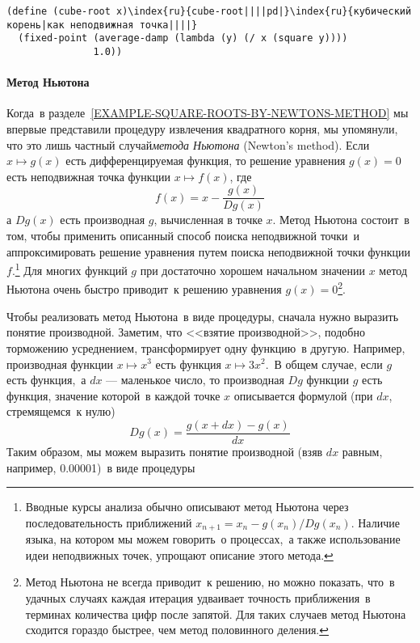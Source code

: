 \begin{Verbatim}[fontsize=\small]
(define (cube-root x)\index{ru}{cube-root||||pd|}\index{ru}{кубический корень|как неподвижная точка||||}
  (fixed-point (average-damp (lambda (y) (/ x (square y))))
               1.0))
\end{Verbatim}

\paragraph{Метод Ньютона}


 Когда~в разделе~\ref{EXAMPLE-SQUARE-ROOTS-BY-NEWTONS-METHOD} мы впервые
представили процедуру извлечения квадратного корня, мы упомянули, что
это лишь частный случай{\em метода
Ньютона} (Newton's method). Если $x \mapsto g(x)$ есть дифференцируемая 
функция, то решение уравнения $g(x) = 0$ есть неподвижная 
точка функции $x \mapsto f(x)$, где
$$
f(x) = x - \dfrac{g(x)}{Dg(x)}
$$
а $Dg(x)$ есть
производная $g$, вычисленная в
точке $x$. Метод Ньютона состоит~в том, чтобы применить
описанный способ поиска неподвижной точки~и аппроксимировать
решение уравнения путем поиска неподвижной точки функции
$f$.\footnote{Вводные курсы анализа обычно описывают метод Ньютона
через последовательность приближений $x_{n+1} = x_n - g(x_n)
/ Dg(x_n)$.  Наличие языка, на котором мы можем
говорить~о процессах,~а также использование идеи неподвижных точек,
упрощают описание этого метода.
}
Для многих функций $g$ при достаточно хорошем начальном
значении $x$ метод Ньютона очень быстро приводит~к решению
уравнения $g(x) = 0$\footnote{Метод Ньютона не всегда приводит~к решению, но можно
показать, что~в удачных случаях каждая итерация удваивает точность
приближения~в терминах количества цифр после запятой. Для таких
случаев метод Ньютона сходится гораздо быстрее, чем метод половинного
деления.
}.

Чтобы реализовать метод Ньютона~в виде процедуры, 
сначала нужно выразить понятие производной.  
Заметим, что <<взятие производной>>, подобно торможению усреднением,
трансформирует одну функцию~в другую.  Например, производная функции
$x \mapsto x^3$ есть функция $x \mapsto 3x^2$.~В 
общем случае, если $g$ есть функция,~а $dx$ ---
маленькое число, то производная $Dg$ функции $g$ есть
функция, значение которой~в каждой точке $x$ описывается
формулой (при $dx$, стремящемся~к нулю)
$$
Dg(x) = \dfrac{g(x + dx) - g(x)}{dx}
$$
Таким образом, мы можем выразить понятие
производной (взяв $dx$ равным, например, 0.00001)~в виде процедуры

